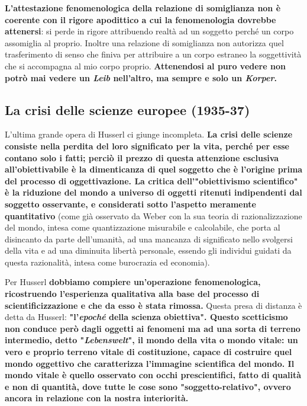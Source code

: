\textbf{L'attestazione fenomenologica della relazione di
somiglianza non è coerente con il rigore
apodittico a cui la fenomenologia dovrebbe
attenersi}: si perde in rigore attribuendo realtà
ad un soggetto perché un corpo assomiglia
al proprio. Inoltre una relazione di somiglianza
non autorizza quel trasferimento di senso che
finiva per attribuire a un corpo estraneo
la soggettività che si accompagna al mio corpo
proprio. \textbf{Attenendosi al puro vedere non potrò mai
vedere un \textit{Leib} nell'altro, ma sempre e solo un \textit{Korper}.}

\subsection{La crisi delle scienze europee (1935-37)}

L'ultima grande opera di Husserl ci giunge incompleta.
\textbf{La crisi delle scienze consiste nella perdita del loro
significato per la vita, perché per esse contano solo
i fatti; perciò il prezzo di questa attenzione esclusiva
all'obiettivabile è la dimenticanza di quel soggetto
che è l'origine prima del processo di oggettivazione.
La critica dell'"obiettivismo scientifico" è la riduzione
del mondo a universo di oggetti ritenuti indipendenti dal soggetto osservante, e considerati sotto
l'aspetto meramente quantitativo} (come già osservato da Weber con la sua teoria di razionalizzazione del mondo, intesa come quantizzazione misurabile e calcolabile, che porta al disincanto da parte dell'umanità,  ad una mancanza di significato nello svolgersi della vita e ad una diminuita libertà personale, essendo gli individui guidati da questa razionalità, intesa come burocrazia ed economia).

Per Husserl \textbf{dobbiamo compiere un'operazione fenomenologica,
ricostruendo l'esperienza qualitativa alla base del
processo di scientificizzazione e che da esso è stata
rimossa.} Questa presa di distanza è detta da Husserl:
\textbf{"l'\textit{epoché} della scienza obiettiva".
Questo scetticismo non conduce però dagli oggetti
ai fenomeni ma ad una sorta di terreno intermedio,
detto "\textit{Lebenswelt}", il mondo della vita o mondo
vitale: un vero e proprio terreno vitale di costituzione,
capace di costruire quel mondo oggettivo che caratterizza
l'immagine scientifica del mondo.
Il mondo vitale è quello osservato con occhi
prescientifici, fatto di qualità e non di quantità,
dove tutte le cose sono "soggetto-relativo",
ovvero ancora in relazione con la nostra interiorità.}

